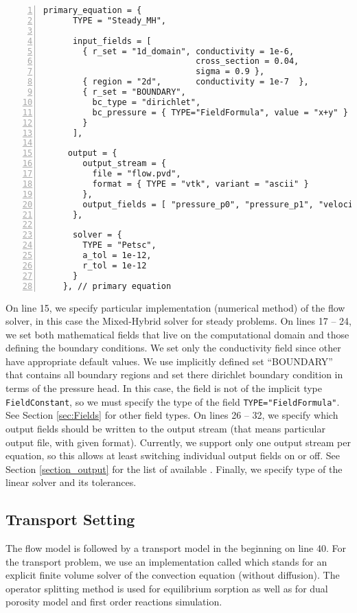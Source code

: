 \begin{Verbatim}[numbers=left, firstnumber=last]
    primary_equation = {
      TYPE = "Steady_MH", 

      input_fields = [
        { r_set = "1d_domain", conductivity = 1e-6, 
                               cross_section = 0.04, 
                               sigma = 0.9 },
        { region = "2d",       conductivity = 1e-7  },
        { r_set = "BOUNDARY",
          bc_type = "dirichlet",
          bc_pressure = { TYPE="FieldFormula", value = "x+y" }
        }
      ],

     output = {
        output_stream = { 
          file = "flow.pvd", 
          format = { TYPE = "vtk", variant = "ascii" }
        }, 
        output_fields = [ "pressure_p0", "pressure_p1", "velocity_p0" ]
      }, 
      
      solver = {
        TYPE = "Petsc",
        a_tol = 1e-12,
        r_tol = 1e-12
      }
    }, // primary equation
\end{Verbatim}
On line 15, we specify particular implementation (numerical method) of the flow solver, in this case the Mixed-Hybrid
solver for steady problems. On lines 17 -- 24, we set both mathematical fields that live on the computational domain 
and those defining the boundary conditions. We set only the conductivity field since other  have appropriate default values.
We use implicitly defined set ``BOUNDARY'' that contains all boundary regions and set there dirichlet boundary condition in terms of the 
pressure head. In this case, the field is not of the implicit type {\tt FieldConstant}, so we must specify the type of the field {\tt TYPE="FieldFormula"}.
See Section \ref{sec:Fields} for other field types. 
On lines 26 -- 32, we specify which output fields should be written to the output stream (that means particular output file, with given format).
Currently, we support only one output stream per equation, so this allows at least switching individual output fields on or off. 
See Section \ref{section_output} for the list of available .
Finally, we specify type of the linear solver and its tolerances.



\subsection{Transport Setting}
The flow model is followed by a transport model in the 
beginning on line 40. For the transport problem, we use an implementation called 
which stands for an explicit finite volume solver of the convection equation (without diffusion).
The operator splitting method is used for equilibrium sorption as well as for dual porosity model and 
first order reactions simulation.

